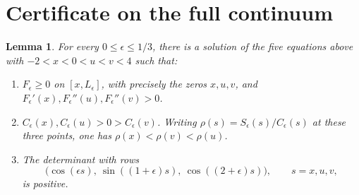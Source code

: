 \documentclass[11pt]{article}
\newtheorem{lemma}{Lemma}
\begin{document}
\section{Certificate on the full continuum}
\begin{lemma}\label{lem:cert}
For every \(0\le\epsilon\le 1/3\), there is a solution of the five
equations above with \(-2<x<0<u<v<4\) such that:
\begin{enumerate}
\item \(F_\epsilon\ge0\) on \([x,L_\epsilon]\), with precisely the
zeros \(x,u,v\), and \(F_\epsilon'(x), F_\epsilon''(u),
F_\epsilon''(v)>0\).
\item \(C_\epsilon(x),C_\epsilon(u)>0>C_\epsilon(v)\).
Writing \(\rho(s)=S_\epsilon(s)/C_\epsilon(s)\) at these three points,
one has \(\rho(x)<\rho(v)<\rho(u)\).
\item The determinant with rows
\[
 \bigl(\cos(\epsilon s),\ \sin((1+\epsilon)s),\
                       \cos((2+\epsilon)s)\bigr),\qquad s=x,u,v,
\]
is positive.
\end{enumerate}
\end{lemma}
\end{document}

